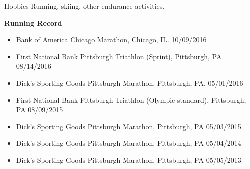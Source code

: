 \documentclass{resume} %
\begin{document}



\begin{rSection}{Hobbies}
Running, skiing, other endurance activities.

\textbf{Running Record}
\begin{itemize}[noitemsep,topsep=0pt]
    \item Bank of America Chicago Marathon, Chicago, IL. \hfill {10/09/2016}
    \item First National Bank Pittsburgh Triathlon (Sprint), Pittsburgh, PA \hfill {08/14/2016}
    \item Dick's Sporting Goods Pittsburgh Marathon, Pittsburgh, PA. \hfill {05/01/2016} 
    \item First National Bank Pittsburgh Triathlon (Olympic standard), Pittsburgh, PA \hfill {08/09/2015}
    \item {Dick's Sporting Goods Pittsburgh Marathon}, {Pittsburgh, PA} \hfill  {05/03/2015}
    \item {Dick's Sporting Goods Pittsburgh Marathon}, {Pittsburgh, PA} \hfill  {{05/04/2014}}
    \item {Dick's Sporting Goods Pittsburgh Marathon}, {Pittsburgh, PA} \hfill  {05/05/2013}
\end{itemize}

\end{rSection}







\end{document}

